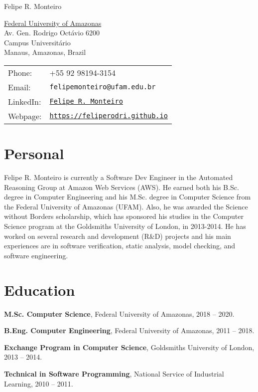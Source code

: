\documentclass[letterpaper]{article}
\def\name{Felipe R. Monteiro}
\renewenvironment{itemize}{
  \begin{list}{}{
    \setlength{\leftmargin}{1.5em}
  }
}{
  \end{list}
}
\begin{document}
{\huge \name}


\vspace{0.25in}

\begin{minipage}{0.45\linewidth}
  \href{https://ufam.edu.br}{Federal University of Amazonas} \\
  Av. Gen. Rodrigo Oct\'avio 6200 \\
 Campus Universit\'ario \\
  Manaus, Amazonas, Brazil
\end{minipage}
\hfill
\begin{minipage}{0.45\linewidth}
  \begin{tabular}{ll}
    Phone: & +55 92 98194-3154 \\
    Email: & {\tt felipemonteiro@ufam.edu.br} \\
    LinkedIn: & \href{https://www.linkedin.com/in/felipe-r-monteiro-91643157/}{\tt Felipe R. Monteiro} \\
    Webpage: & \href{https://feliperodri.github.io}{\tt https://feliperodri.github.io} \\
  \end{tabular}
\end{minipage}

\section*{Personal}

Felipe R. Monteiro is currently a Software Dev Engineer in the Automated Reasoning Group at Amazon Web Services (AWS). He earned both his B.Sc. degree in Computer Engineering and his M.Sc. degree in Computer Science from the Federal University of Amazonas (UFAM). Also, he was awarded the Science without Borders scholarship, which has sponsored his studies in the Computer Science program at the Goldsmiths University of London, in 2013-2014. He has worked on several research and development (R\&D) projects and his main experiences are in software verification, static analysis, model checking, and software engineering.

\section*{Education}

\begin{itemize}
  \item {\bf M.Sc. Computer Science}, Federal University of Amazonas, 2018 -- 2020.
  
  \item {\bf B.Eng. Computer Engineering}, Federal University of Amazonas, 2011 -- 2018.

  \item {\bf Exchange Program in Computer Science}, Goldsmiths University of London, 2013 -- 2014.

  \item {\bf Technical in Software Programming}, National Service of Industrial Learning, 2010 -- 2011.
\end{itemize}
\end{document}
